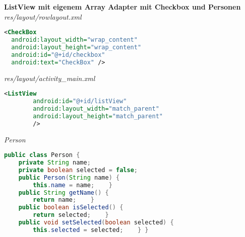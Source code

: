 \textbf{ListView mit eigenem Array Adapter mit Checkbox und Personen} \\
\textit{res/layout/rowlayout.xml}
\begin{lstlisting}[language=xml]
<CheckBox
  android:layout_width="wrap_content"
  android:layout_height="wrap_content"
  android:id="@+id/checkbox"
  android:text="CheckBox" />
\end{lstlisting}

\textit{res/layout/activity\_main.xml}
\begin{lstlisting}[language=xml]
<ListView
        android:id="@+id/listView"
        android:layout_width="match_parent"
        android:layout_height="match_parent"
        />
\end{lstlisting}

\textit{Person}
\begin{lstlisting}[language=java]
public class Person {
    private String name;
    private boolean selected = false;
    public Person(String name) {
        this.name = name;    }
    public String getName() {
        return name;    }
    public boolean isSelected() {
        return selected;    }
    public void setSelected(boolean selected) {
        this.selected = selected;    } }
\end{lstlisting}

